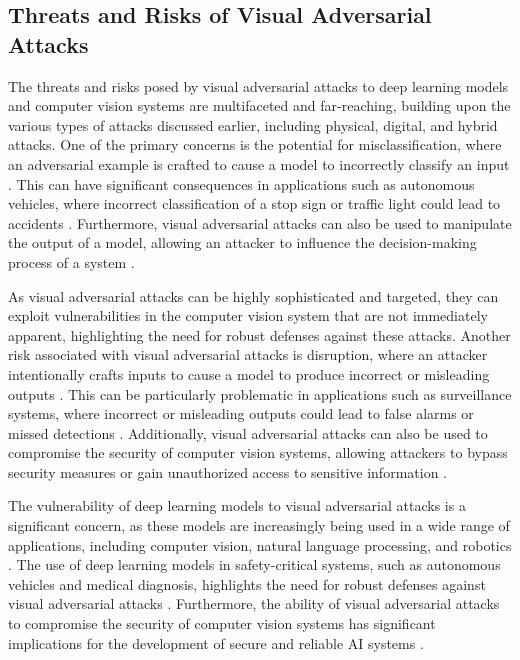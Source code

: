 \documentclass[11pt]{article}
\begin{document}
\subsection{Threats and Risks of Visual Adversarial Attacks}

The threats and risks posed by visual adversarial attacks to deep learning models and computer vision systems are multifaceted and far-reaching, building upon the various types of attacks discussed earlier, including physical, digital, and hybrid attacks. One of the primary concerns is the potential for misclassification, where an adversarial example is crafted to cause a model to incorrectly classify an input \cite{ref17}. This can have significant consequences in applications such as autonomous vehicles, where incorrect classification of a stop sign or traffic light could lead to accidents \cite{ref18}. Furthermore, visual adversarial attacks can also be used to manipulate the output of a model, allowing an attacker to influence the decision-making process of a system \cite{ref19}.

As visual adversarial attacks can be highly sophisticated and targeted, they can exploit vulnerabilities in the computer vision system that are not immediately apparent, highlighting the need for robust defenses against these attacks. Another risk associated with visual adversarial attacks is disruption, where an attacker intentionally crafts inputs to cause a model to produce incorrect or misleading outputs \cite{ref20}. This can be particularly problematic in applications such as surveillance systems, where incorrect or misleading outputs could lead to false alarms or missed detections \cite{ref21}. Additionally, visual adversarial attacks can also be used to compromise the security of computer vision systems, allowing attackers to bypass security measures or gain unauthorized access to sensitive information \cite{ref22}.

The vulnerability of deep learning models to visual adversarial attacks is a significant concern, as these models are increasingly being used in a wide range of applications, including computer vision, natural language processing, and robotics \cite{ref4}. The use of deep learning models in safety-critical systems, such as autonomous vehicles and medical diagnosis, highlights the need for robust defenses against visual adversarial attacks \cite{ref23}. Furthermore, the ability of visual adversarial attacks to compromise the security of computer vision systems has significant implications for the development of secure and reliable AI systems \cite{ref24}.
\end{document}
